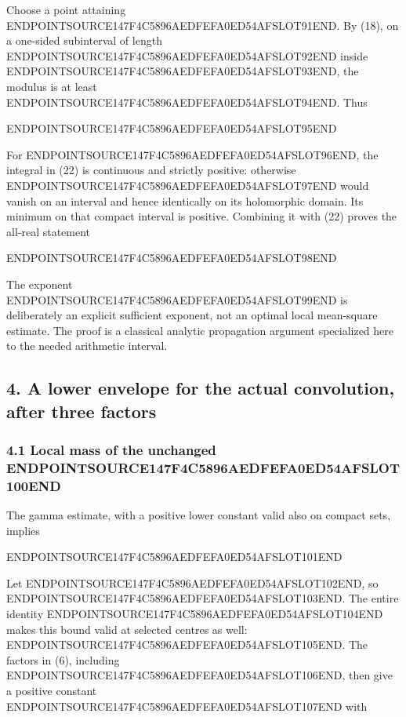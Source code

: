 Choose a point attaining ENDPOINTSOURCE147F4C5896AEDFEFA0ED54AFSLOT91END. By (18), on a one-sided subinterval of length ENDPOINTSOURCE147F4C5896AEDFEFA0ED54AFSLOT92END inside ENDPOINTSOURCE147F4C5896AEDFEFA0ED54AFSLOT93END, the modulus is at least ENDPOINTSOURCE147F4C5896AEDFEFA0ED54AFSLOT94END. Thus

ENDPOINTSOURCE147F4C5896AEDFEFA0ED54AFSLOT95END

For ENDPOINTSOURCE147F4C5896AEDFEFA0ED54AFSLOT96END, the integral in (22) is continuous and strictly positive: otherwise ENDPOINTSOURCE147F4C5896AEDFEFA0ED54AFSLOT97END would vanish on an interval and hence identically on its holomorphic domain. Its minimum on that compact interval is positive. Combining it with (22) proves the all-real statement

ENDPOINTSOURCE147F4C5896AEDFEFA0ED54AFSLOT98END

The exponent ENDPOINTSOURCE147F4C5896AEDFEFA0ED54AFSLOT99END is deliberately an explicit sufficient exponent, not an optimal local mean-square estimate. The proof is a classical analytic propagation argument specialized here to the needed arithmetic interval.

\subsection{4. A lower envelope for the actual convolution, after three factors}\label{endpoint-arithmetic_original--a-lower-envelope-for-the-actual-convolution-after-three-factors}

\subsubsection{\texorpdfstring{4.1 Local mass of the unchanged ENDPOINTSOURCE147F4C5896AEDFEFA0ED54AFSLOT100END}{4.1 Local mass of the unchanged }}\label{endpoint-arithmetic_original--local-mass-of-the-unchanged-gh}

The gamma estimate, with a positive lower constant valid also on compact sets, implies

ENDPOINTSOURCE147F4C5896AEDFEFA0ED54AFSLOT101END

Let ENDPOINTSOURCE147F4C5896AEDFEFA0ED54AFSLOT102END, so ENDPOINTSOURCE147F4C5896AEDFEFA0ED54AFSLOT103END. The entire identity ENDPOINTSOURCE147F4C5896AEDFEFA0ED54AFSLOT104END makes this bound valid at selected centres as well: ENDPOINTSOURCE147F4C5896AEDFEFA0ED54AFSLOT105END. The factors in (6), including ENDPOINTSOURCE147F4C5896AEDFEFA0ED54AFSLOT106END, then give a positive constant ENDPOINTSOURCE147F4C5896AEDFEFA0ED54AFSLOT107END with

